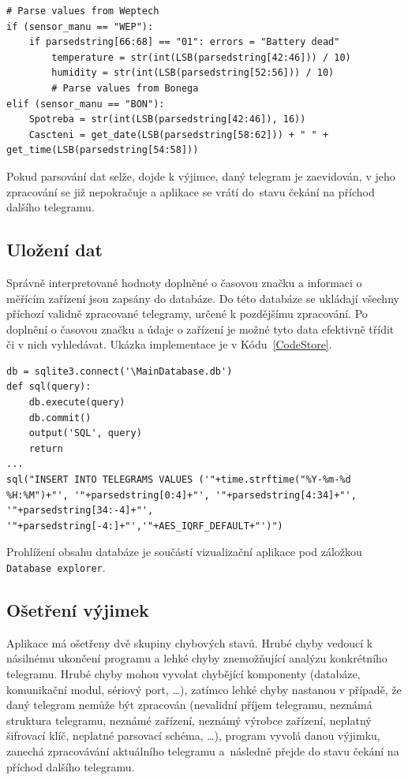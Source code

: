 \begin{lstlisting}[caption={Ukázka parsování dat},captionpos=b,label=CodeParse,style=MyCodePython]
# Parse values from Weptech
if (sensor_manu == "WEP"):
	if parsedstring[66:68] == "01": errors = "Battery dead"
		temperature = str(int(LSB(parsedstring[42:46])) / 10)
		humidity = str(int(LSB(parsedstring[52:56])) / 10)
		# Parse values from Bonega       
elif (sensor_manu == "BON"):
	Spotreba = str(int(LSB(parsedstring[42:46]), 16))
	Cascteni = get_date(LSB(parsedstring[58:62])) + " " + get_time(LSB(parsedstring[54:58]))
\end{lstlisting}
Pokud parsování dat selže, dojde k výjimce, daný telegram je zaevidován, v jeho zpracování se již nepokračuje a aplikace se vrátí do~stavu čekání na příchod dalšího telegramu.

\subsection{Uložení dat}
\label{SectionUlozeniDatabaze2}
Správně interpretované hodnoty doplněné o časovou značku a informaci o měřícím zařízení jsou zapsány do databáze. Do této databáze se ukládají všechny příchozí validně zpracované telegramy, určené k pozdějšímu zpracování. Po doplnění o časovou značku a údaje o zařízení je možné tyto data efektivně třídit či v nich vyhledávat. Ukázka implementace je v Kódu~\ref{CodeStore}.

\vspace{10pt}

\begin{lstlisting}[caption={Ukázka ukládání dat},captionpos=b,label=CodeStore,style=MyCodePython]
db = sqlite3.connect('\MainDatabase.db')
def sql(query):
    db.execute(query)
    db.commit()
    output('SQL', query)
    return
...
sql("INSERT INTO TELEGRAMS VALUES ('"+time.strftime("%Y-%m-%d %H:%M")+"', '"+parsedstring[0:4]+"', '"+parsedstring[4:34]+"', '"+parsedstring[34:-4]+"', '"+parsedstring[-4:]+"','"+AES_IQRF_DEFAULT+"')")		
\end{lstlisting}

Prohlížení obsahu databáze je součástí vizualizační aplikace pod záložkou \texttt{Database explorer}.


\subsection{Ošetření výjimek}
\label{SectionUlozeniLogu}
Aplikace má ošetřeny dvě skupiny chybových stavů. Hrubé chyby vedoucí k násilnému ukončení programu a lehké chyby znemožňující analýzu konkrétního telegramu. Hrubé chyby mohou vyvolat chybějící komponenty (databáze, komunikační modul, sériový port, \ldots), zatímco lehké chyby nastanou v případě, že daný telegram nemůže být zpracován (nevalidní příjem telegramu, neznámá struktura telegramu, neznámé zařízení, neznámý výrobce zařízení, neplatný šifrovací klíč, neplatné parsovací schéma, \ldots ), program vyvolá danou výjimku, zanechá zpracovávání aktuálního telegramu a~následně přejde do stavu čekání na příchod dalšího telegramu.

